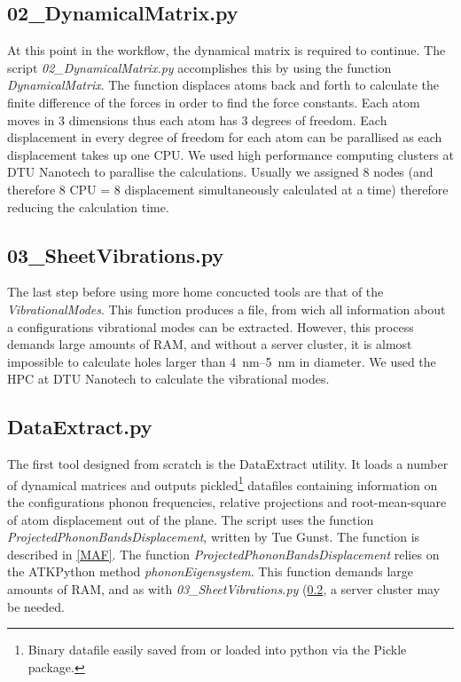 \subsection{02\_DynamicalMatrix.py}\label{02}
At this point in the workflow, the dynamical matrix is required to continue. The script \textit{02\_DynamicalMatrix.py} accomplishes this by using the function \textit{DynamicalMatrix}. The function displaces atoms back and forth to calculate the finite difference of the forces in order to find the force constants. Each atom moves in 3 dimensions thus each atom has 3 degrees of freedom. Each displacement in every degree of freedom for each atom can be parallised as each displacement takes up one CPU. We used high performance computing clusters at DTU Nanotech to parallise the calculations. Usually we assigned 8 nodes (and therefore 8 CPU = 8 displacement simultaneously calculated at a time) therefore reducing the calculation time.

\subsection{03\_SheetVibrations.py}\label{03}
The last step before using more home concucted tools are that of the \textit{VibrationalModes}. This function produces a file, from wich all information about a configurations vibrational modes can be extracted. However, this process demands large amounts of RAM, and without a server cluster, it is almost impossible to calculate holes larger than \SIrange{4}{5}{\nm} in diameter. We used the HPC at DTU Nanotech to calculate the vibrational modes.
\subsection{DataExtract.py}\label{DE}
The first tool designed from scratch is the DataExtract utility. It loads a number of dynamical matrices and outputs pickled\footnote{Binary datafile easily saved from or loaded into python via the Pickle package.} datafiles containing information on the configurations phonon frequencies, relative projections and root-mean-square of atom displacement out of the plane. The script uses the function \textit{ProjectedPhononBandsDisplacement}, written by Tue Gunst. The function is described in \cref{MAF}.
The function \textit{ProjectedPhononBandsDisplacement} relies on the ATKPython method \textit{phononEigensystem}. This function demands large amounts of RAM, and as with \textit{03\_SheetVibrations.py} (\cref{03}, a server cluster may be needed.

